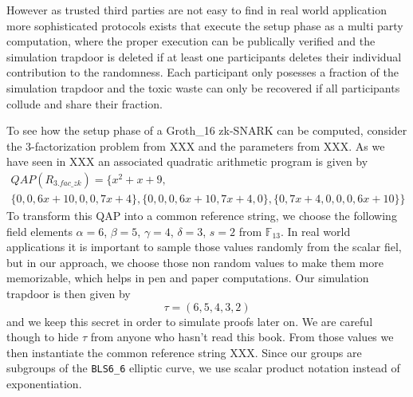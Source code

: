 However as trusted third parties are not easy to find in real world application more sophisticated protocols exists that execute the setup phase as a multi party computation, where the proper execution can be publically verified and the simulation trapdoor is deleted if at least one participants deletes their individual contribution to the randomness. Each participant only posesses a fraction of the simulation trapdoor and the toxic waste can only be recovered if all participants collude and share their fraction.
\begin{example} To see how the setup phase of a Groth\_16 zk-SNARK can be computed, consider the $3$-factorization problem from XXX and the parameters from XXX. As we have seen in XXX an associated quadratic arithmetic program is given by
\begin{multline*}
QAP(R_{3.fac\_zk}) =\{x^{2}+x+9,\\
 \{0,0,6x+10,0,0,7x+4\},\{0,0,0,6x+10,7x+4,0\},\{0,7x+4,0,0,0,6x+10\}\}
\end{multline*}
To transform this QAP into a common reference string, we choose the following field elements $\alpha=6$, $\beta=5$, $\gamma=4$, $\delta=3$, $s=2$ from $\mathbb{F}_{13}$. 
In real world applications it is important to sample those values randomly from the scalar fiel, but in our approach, we choose those non random values to make them more memorizable, which helps in pen and paper computations. Our simulation trapdoor is then given by
$$
\tau = (6,5,4,3,2)
$$
and we keep this secret in order to simulate proofs later on. We are careful though to hide $\tau$ from anyone who hasn't read this book. From those values we then instantiate the common reference string XXX. Since our groups are subgroups of the \texttt{BLS6\_6} elliptic curve, we use scalar product notation instead of exponentiation. 


\end{example}
